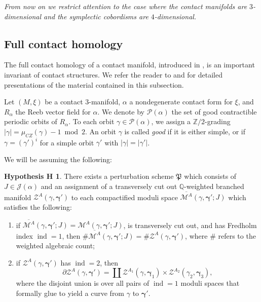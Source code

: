 \documentclass[10pt]{amsart}
\let\mathcal\mathscr
\theoremstyle{plain}
\theoremstyle{definition}
\newtheorem*{hypH}{Hypothesis H}
\numberwithin{equation}{subsection}
\newcommand{\QQ}{\mathbb{Q}}
\newcommand{\bdry}{\partial}
\let\op\operatorname
\let\bs\boldsymbol
\newcommand{\be}{\begin{enumerate}}
\newcommand{\ee}{\end{enumerate}}
\begin{document}
{\em From now on we restrict attention to the case where the contact manifolds are $3$-dimensional and the symplectic cobordisms are $4$-dimensional.}

\subsection{Full contact homology} \label{sec3.2.1}

The full contact homology of a contact manifold, introduced in \cite{SFT}, is an important invariant of contact structures. We refer the reader to \cite{SFT} and \cite{B} for detailed presentations of the material contained in this subsection.

Let $(M,\xi)$ be a contact $3$-manifold, $\alpha$ a nondegenerate contact form for $\xi$, and $R_\alpha$ the Reeb vector field for $\alpha$. We denote by $\mathcal{P}(\alpha)$ the set of good contractible periodic orbits of $R_\alpha$. To each orbit $\gamma \in \mathcal{P}(\alpha)$, we assign a $\mathbb{Z}/2$-grading $|\gamma| = \mu_{CZ}(\gamma) -1\bmod2$. An orbit $\gamma$ is called {\em good} if it is either simple, or if $\gamma = (\gamma')^i$ for a simple orbit $\gamma'$ with $ |\gamma|=|\gamma'|$.

We will be assuming the following:

\begin{hypH}
There exists a perturbation scheme ${\mathfrak P}$ which consists of $J\in \mathcal{J}(\alpha)$ and an assignment of a transversely cut out $\QQ$-weighted branched manifold $\mathcal{Z}^A(\gamma,\bs\gamma')$ to each compactified moduli space $\overline{\mathcal{M}^A}(\gamma,\bs\gamma';J)$ which satisfies the following:
\be
\item if $\overline{\mathcal{M}^A}(\gamma,\bs\gamma';J)=\mathcal{M}^A(\gamma,\bs\gamma';J)$, is transversely cut out, and has Fredholm index $\op{ind}=1$, then $\# \overline{\mathcal{M}^A}(\gamma,\bs\gamma';J)=\#\mathcal{Z}^A(\gamma,\bs\gamma')$, where $\#$ refers to the weighted algebraic count;
\item if $\mathcal{Z}^A(\gamma,\bs\gamma')$ has $\op{ind}=2$, then
$$\bdry\mathcal{Z}^A(\gamma,\bs\gamma')=\coprod\mathcal{Z}^{A_1}(\gamma,\bs\gamma_1) \times \mathcal{Z}^{A_2}(\gamma_2,\bs\gamma_3),$$
where the disjoint union is over all pairs of $\op{ind}=1$ moduli spaces that formally glue to yield a curve from $\gamma$ to $\bs\gamma'$.
\ee
\end{hypH}
\end{document}
